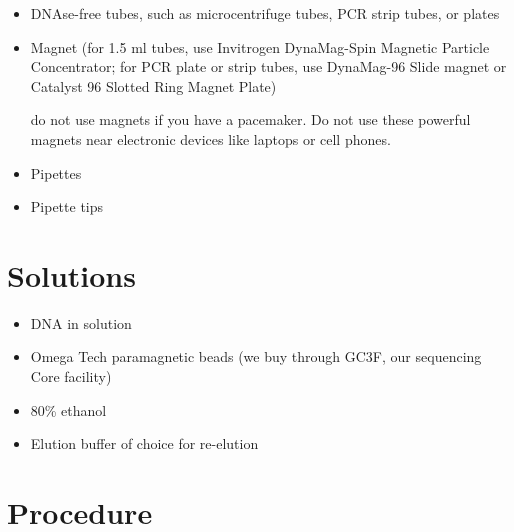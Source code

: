 \documentclass[
  letterpaper,
  DIV=11,
  numbers=noendperiod]{scrreprt}
\providecommand{\tightlist}{%
  \setlength{\itemsep}{0pt}\setlength{\parskip}{0pt}}\usepackage{longtable,booktabs,array}
\begin{document}
\begin{itemize}
\item
  DNAse-free tubes, such as microcentrifuge tubes, PCR strip tubes, or
  plates
\item
  Magnet (for 1.5 ml tubes, use Invitrogen DynaMag-Spin Magnetic
  Particle Concentrator; for PCR plate or strip tubes, use DynaMag-96
  Slide magnet or Catalyst 96 Slotted Ring Magnet Plate)

  \begin{tcolorbox}[enhanced jigsaw, toprule=.15mm, breakable, coltitle=black, leftrule=.75mm, title=\textcolor{quarto-callout-important-color}{\faExclamation}\hspace{0.5em}{This is important}, bottomrule=.15mm, toptitle=1mm, bottomtitle=1mm, colframe=quarto-callout-important-color-frame, opacityback=0, colback=white, opacitybacktitle=0.6, colbacktitle=quarto-callout-important-color!10!white, rightrule=.15mm, titlerule=0mm, arc=.35mm, left=2mm]

  do not use magnets if you have a pacemaker. Do not use these powerful
  magnets near electronic devices like laptops or cell phones.

  \end{tcolorbox}
\item
  Pipettes
\item
  Pipette tips
\end{itemize}

\hypertarget{solutions-18}{%
\section{Solutions}\label{solutions-18}}

\begin{itemize}
\tightlist
\item
  DNA in solution
\item
  Omega Tech paramagnetic beads (we buy through GC3F, our sequencing
  Core facility)
\item
  80\% ethanol
\item
  Elution buffer of choice for re-elution
\end{itemize}

\hypertarget{procedure-19}{%
\section{Procedure}\label{procedure-19}}
\end{document}
